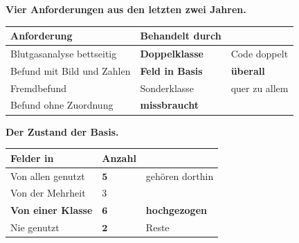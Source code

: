 \begin{merksatz}
\textbf{Vier Anforderungen aus den letzten zwei Jahren.}

\begin{center}
{\small
\renewcommand{\arraystretch}{1.45}
\begin{tabular}{@{}P{3.2cm}P{2.4cm}P{2.4cm}@{}}
\toprule
\textbf{Anforderung} & \textbf{Behandelt durch} & \\
\midrule
Blutgasanalyse bettseitig & \textbf{Doppelklasse} & \textcolor{akzent}{Code doppelt}\\
Befund mit Bild und Zahlen & \textcolor{akzent}{\textbf{Feld  in Basis}} & \textcolor{akzent}{\textbf{überall }}\\
Fremdbefund & Sonderklasse & \textcolor{akzent}{quer zu allem}\\
Befund ohne Zuordnung & \textcolor{akzent}{\textbf{ missbraucht}} & \\
\bottomrule
\end{tabular}}
\end{center}

\begin{center}
\begin{minipage}{0.88\textwidth}
\end{minipage}
\end{center}

\textbf{Der Zustand der Basis.}

\begin{center}
\renewcommand{\arraystretch}{1.45}
\begin{tabular}{@{}P{3.0cm}P{2.0cm}P{2.6cm}@{}}
\toprule
\textbf{Felder in } & \textbf{Anzahl} & \\
\midrule
Von allen genutzt & $\mathbf{5}$ & \textcolor{gruen}{gehören dorthin}\\
Von der Mehrheit & $3$ & \\
\textbf{Von einer Klasse} & \textcolor{akzent}{$\mathbf{6}$} & \textcolor{akzent}{\textbf{hochgezogen}}\\
Nie genutzt & $\mathbf{2}$ & \textcolor{akzent}{Reste}\\
\bottomrule
\end{tabular}
\end{center}

\begin{center}
\end{center}
\end{merksatz}

